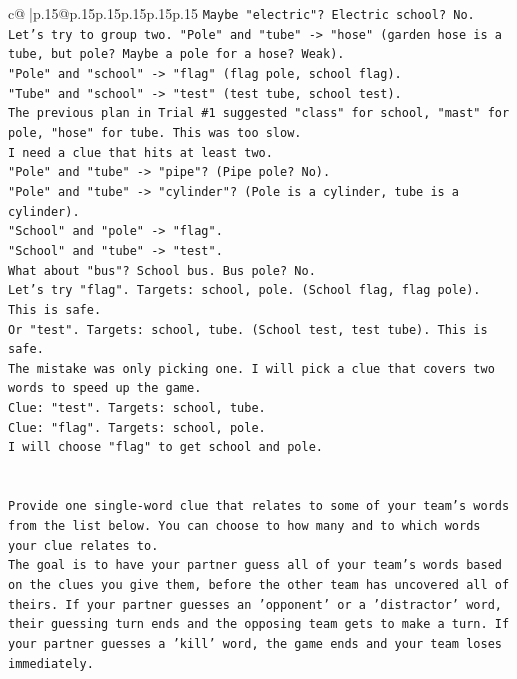 \documentclass{article}
\begin{document}
{\begin{supertabular}{c@{$\;$}|p{.15\linewidth}@{}p{.15\linewidth}p{.15\linewidth}p{.15\linewidth}p{.15\linewidth}p{.15\linewidth}}
{{{\texttt{Maybe "electric"? Electric school? No.} \\
\texttt{Let's try to group two. "Pole" and "tube" {-}> "hose" (garden hose is a tube, but pole? Maybe a pole for a hose? Weak).} \\
\texttt{"Pole" and "school" {-}> "flag" (flag pole, school flag).} \\
\texttt{"Tube" and "school" {-}> "test" (test tube, school test).} \\
\texttt{The previous plan in Trial \#1 suggested "class" for school, "mast" for pole, "hose" for tube. This was too slow.} \\
\texttt{I need a clue that hits at least two.} \\
\texttt{"Pole" and "tube" {-}> "pipe"? (Pipe pole? No).} \\
\texttt{"Pole" and "tube" {-}> "cylinder"? (Pole is a cylinder, tube is a cylinder).} \\
\texttt{"School" and "pole" {-}> "flag".} \\
\texttt{"School" and "tube" {-}> "test".} \\
\texttt{What about "bus"? School bus. Bus pole? No.} \\
\texttt{Let's try "flag". Targets: school, pole. (School flag, flag pole). This is safe.} \\
\texttt{Or "test". Targets: school, tube. (School test, test tube). This is safe.} \\
\texttt{The mistake was only picking one. I will pick a clue that covers two words to speed up the game.} \\
\texttt{Clue: "test". Targets: school, tube.} \\
\texttt{Clue: "flag". Targets: school, pole.} \\
\texttt{I will choose "flag" to get school and pole.} \\
\\ 
\\ 
\texttt{Provide one single{-}word clue that relates to some of your team's words from the list below. You can choose to how many and to which words your clue relates to.} \\
\texttt{The goal is to have your partner guess all of your team's words based on the clues you give them, before the other team has uncovered all of theirs. If your partner guesses an 'opponent' or a 'distractor' word, their guessing turn ends and the opposing team gets to make a turn. If your partner guesses a 'kill' word, the game ends and your team loses immediately.} \\
}}}
\end{supertabular}}
\end{document}
